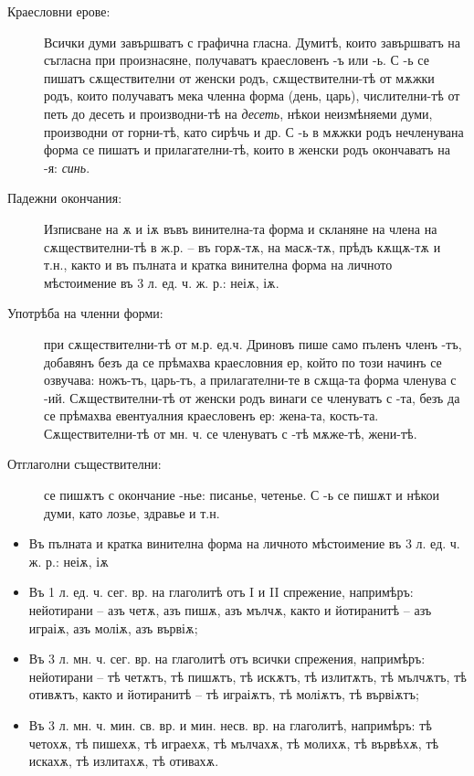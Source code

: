 \documentclass{article}
\begin{document}
		\begin{description} 
		
		\item[Краесловни ерове:] Всички думи завършватъ с графична гласна. 
		Думитѣ, които завършватъ на съгласна при произнасяне, получаватъ краесловенъ -ъ или -ь. С -ь се пишатъ сѫществителни от женски родъ, сѫществителни-тѣ от мѫжки родъ, които получаватъ мека членна форма (день, царь), числителни-тѣ от петь до десеть и производни-тѣ на \textit{десеть}, нѣкои неизмѣняеми думи, производни от горни-тѣ, като сирѣчь и др. 
		С -ь в мѫжки родъ нечленувана форма се пишатъ и прилагателни-тѣ, които в женски родъ окончаватъ на -я: \textit{синь}.	
		
		\item[Падежни окончания:] Изписване на ѫ и іѫ въвъ винителна-та форма и скланяне на члена на сѫществителни-тѣ в ж.р. -- въ горѫ-тѫ, на масѫ-тѫ, прѣдъ кѫщѫ-тѫ и т.н., 
		както и въ пълната и кратка винителна форма на личното мѣстоимение въ 3 л. ед. ч. ж. р.: неіѫ, іѫ.
		
		\item[Употрѣба на членни форми:] при сѫществителни-тѣ от м.р. ед.ч. Дриновъ пише само пъленъ членъ -тъ, добавянъ безъ да се прѣмахва краесловния ер, който по този начинъ се озвучава: ножъ-тъ, царь-тъ, а прилагателни-те в сѫща-та форма членува с -ий. 
		Сѫществителни-тѣ от женски родъ винаги се членуватъ с -та, безъ да се прѣмахва евентуалния краесловенъ ер: жена-та, кость-та. 
		Сѫществителни-тѣ от мн. ч. се членуватъ с -тѣ мѫже-тѣ, жени-тѣ.
		
		\item[Отглаголни съществителни:] се пишѫтъ с окончание -нье: писанье, четенье. С -ь се пишѫт и нѣкои думи, като лозье, здравье и т.н.
	
		\end{description}
	

	
	\begin{itemize}
		\item Въ пълната и кратка винителна форма на личното мѣстоимение въ 3 л. ед. ч. ж. р.: неіѫ, іѫ
		
		\item Въ 1 л. ед. ч. сег. вр. на глаголитѣ отъ I и II спрежение, напримѣръ: 
		нейотирани -- 
			азъ четѫ, азъ пишѫ, азъ мълчѫ, 
		 както и йотиранитѣ --  
		 	азъ играіѫ, азъ моліѫ, азъ вървіѫ;
		 
		\item Въ 3 л. мн. ч. сег. вр. на глаголитѣ отъ всички спрежения, напримѣръ: 
			 нейотирани -- тѣ четѫтъ, тѣ пишѫтъ, тѣ искѫтъ, тѣ излитѫтъ, тѣ мълчѫтъ, тѣ отивѫтъ,
			 както и йотиранитѣ -- 
			тѣ играіѫтъ, тѣ моліѫтъ, тѣ вървіѫтъ;
		
		\item Въ 3 л. мн. ч. мин. св. вр. и мин. несв. вр. на глаголитѣ, напримѣръ: 
			тѣ четохѫ, тѣ пишехѫ, тѣ играехѫ, тѣ мълчахѫ, тѣ молихѫ, тѣ вървѣхѫ, тѣ искахѫ, тѣ излитахѫ, тѣ отивахѫ.
	\end{itemize}
\end{document}
